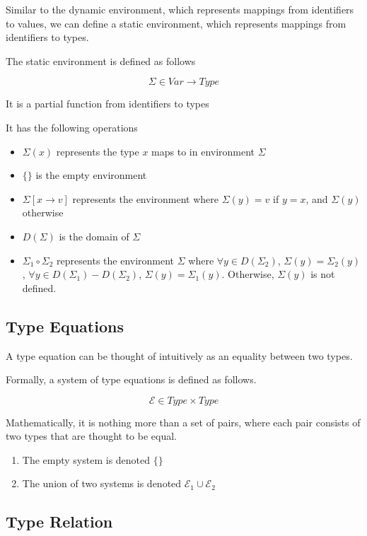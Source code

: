 \documentclass[titlepage]{article}
\begin{document}
Similar to the dynamic environment, which represents mappings from identifiers to values, we can define a static environment, which represents mappings from identifiers to types.

The static environment is defined as follows

$$\Sigma \in Var \rightarrow Type$$

It is a partial function from identifiers to types

It has the following operations

\begin{itemize}
  \item $\Sigma (x)$ represents the type $x$ maps to in environment $\Sigma$
  \item $\{\}$ is the empty environment
  \item $\Sigma [x \rightarrow v]$ represents the environment where $\Sigma (y) = v$ if $y = x$, and $\Sigma (y)$ otherwise
  \item $D(\Sigma)$ is the domain of $\Sigma$
  \item $\Sigma_1 \circ \Sigma_2$ represents the environment $\Sigma$ where $\forall y \in D(\Sigma_2)$, $\Sigma(y) = \Sigma_2(y)$, $\forall y \in D(\Sigma_1) - D(\Sigma_2)$, $\Sigma(y) = \Sigma_1(y)$. Otherwise, $\Sigma(y)$ is not defined.
  \end{itemize}

\subsection{Type Equations}

A type equation can be thought of intuitively as an equality between two types.

Formally, a system of type equations is defined as follows.

$$\mathcal{E} \in Type \times Type$$

Mathematically, it is nothing more than a set of pairs, where each pair consists of two types that are thought to be equal.

\begin{enumerate}
\item The empty system is denoted $\{\}$
\item The union of two systems is denoted $\mathcal{E}_1 \cup \mathcal{E}_2$

\end{enumerate}

\newpage

\subsection{Type Relation}
\end{document}
